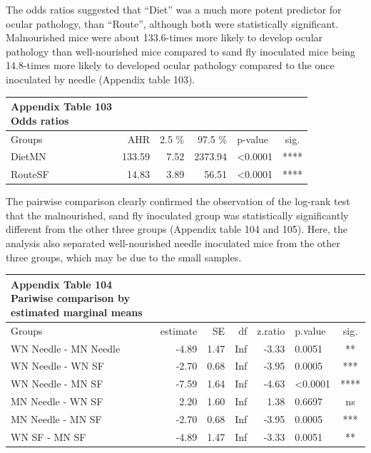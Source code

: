 \documentclass[
  12pt,
  letterpaper,
]{article}
\begin{document}
The odds ratios suggested that ``Diet'' was a much more potent predictor for ocular pathology, than ``Route'', although both were statistically significant. Malnourished mice were about 133.6-times more likely to develop ocular pathology than well-nourished mice compared to sand fly inoculated mice being 14.8-times more likely to developed ocular pathology compared to the once inoculated by needle (Appendix table 103).

\begingroup
\fontsize{12.0pt}{14.4pt}\selectfont
\begin{longtable}{l|rrrlc}
\caption*{
{\large \textbf{Appendix Table 103}} \\ 
{\small \textbf{Odds ratios}}
} \\ 
\toprule
Groups & {AHR} & 2.5 \% & 97.5 \% & {p-value} & {sig.} \\ 
\midrule\addlinespace[2.5pt]
DietMN & 133.59 & 7.52 & 2373.94 & <0.0001 & **** \\ 
RouteSF & 14.83 & 3.89 & 56.51 & <0.0001 & **** \\ 
\bottomrule
\end{longtable}
\endgroup

The pairwise comparison clearly confirmed the observation of the log-rank test that the malnourished, sand fly inoculated group was statistically significantly different from the other three groups (Appendix table 104 and 105). Here, the analysis also separated well-nourished needle inoculated mice from the other three groups, which may be due to the small samples.

\begingroup
\fontsize{12.0pt}{14.4pt}\selectfont
\begin{longtable}{l|rrrrlc}
\caption*{
{\large \textbf{Appendix Table 104}} \\ 
{\small \textbf{Pariwise comparison by estimated marginal means}}
} \\ 
\toprule
Groups & {estimate} & {SE} & {df} & {z.ratio} & {p.value} & {sig.} \\ 
\midrule\addlinespace[2.5pt]
WN Needle - MN Needle & -4.89 & 1.47 & Inf & -3.33 & 0.0051 & ** \\ 
WN Needle - WN SF & -2.70 & 0.68 & Inf & -3.95 & 0.0005 & *** \\ 
WN Needle - MN SF & -7.59 & 1.64 & Inf & -4.63 & <0.0001 & **** \\ 
MN Needle - WN SF & 2.20 & 1.60 & Inf & 1.38 & 0.6697 & ns \\ 
MN Needle - MN SF & -2.70 & 0.68 & Inf & -3.95 & 0.0005 & *** \\ 
WN SF - MN SF & -4.89 & 1.47 & Inf & -3.33 & 0.0051 & ** \\ 
\bottomrule
\end{longtable}
\endgroup
\end{document}
